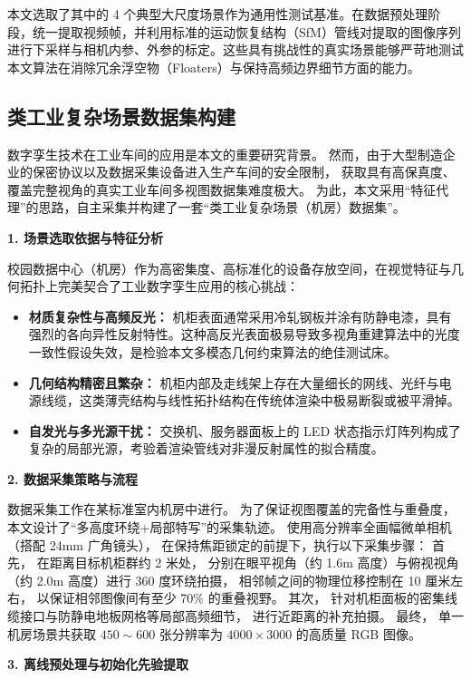 本文选取了其中的 4 个典型大尺度场景作为通用性测试基准。在数据预处理阶段，统一提取视频帧，并利用标准的运动恢复结构（SfM）管线对提取的图像序列进行下采样与相机内参、外参的标定。这些具有挑战性的真实场景能够严苛地测试本文算法在消除冗余浮空物（Floaters）与保持高频边界细节方面的能力。

\subsection{类工业复杂场景数据集构建}
\label{subsec:custom_dataset}

数字孪生技术在工业车间的应用是本文的重要研究背景。
然而，由于大型制造企业的保密协议以及数据采集设备进入生产车间的安全限制，
获取具有高保真度、覆盖完整视角的真实工业车间多视图数据集难度极大。
为此，本文采用“特征代理”的思路，自主采集并构建了一套“类工业复杂场景（机房）数据集”。

\textbf{1. 场景选取依据与特征分析}

校园数据中心（机房）作为高密集度、高标准化的设备存放空间，在视觉特征与几何拓扑上完美契合了工业数字孪生应用的核心挑战：
\begin{itemize}
    \item \textbf{材质复杂性与高频反光：} 机柜表面通常采用冷轧钢板并涂有防静电漆，具有强烈的各向异性反射特性。这种高反光表面极易导致多视角重建算法中的光度一致性假设失效，是检验本文多模态几何约束算法的绝佳测试床。
    \item \textbf{几何结构精密且繁杂：} 机柜内部及走线架上存在大量细长的网线、光纤与电源线缆，这类薄壳结构与线性拓扑结构在传统体渲染中极易断裂或被平滑掉。
    \item \textbf{自发光与多光源干扰：} 交换机、服务器面板上的 LED 状态指示灯阵列构成了复杂的局部光源，考验着渲染管线对非漫反射属性的拟合精度。
\end{itemize}

\textbf{2. 数据采集策略与流程}

数据采集工作在某标准室内机房中进行。
为了保证视图覆盖的完备性与重叠度，
本文设计了“多高度环绕+局部特写”的采集轨迹。
使用高分辨率全画幅微单相机（搭配 24mm 广角镜头），
在保持焦距锁定的前提下，执行以下采集步骤：
首先，
在距离目标机柜群约 2 米处，
分别在眼平视角（约 1.6m 高度）与俯视视角（约 2.0m 高度）进行 360 度环绕拍摄，
相邻帧之间的物理位移控制在 10 厘米左右，
以保证相邻图像间有至少 70\% 的重叠视野。
其次，
针对机柜面板的密集线缆接口与防静电地板网格等局部高频细节，
进行近距离的补充拍摄。
最终，
单一机房场景共获取 $450 \sim 600$ 张分辨率为 $4000 \times 3000$ 的高质量 RGB 图像。

\textbf{3. 离线预处理与初始化先验提取}

